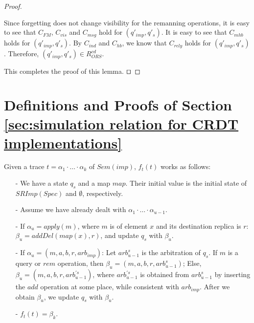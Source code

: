 \begin {proof}
\begin{itemize}
    Since forgetting does not change visibility for the remanning operations, it is easy to see that $C_{\mathit{FM}}$, $C_{\mathit{vis}}$ and $C_{\mathit{msg}}$ hold for $(q'_{\mathit{imp}},q'_s)$. It is easy to see that $C_{\mathit{mhb}}$ holds for $(q'_{\mathit{imp}},q'_s)$. By $C_{\mathit{ind}}$ and $C_{\mathit{hb}}$, we know that $C_{\mathit{rely}}$ holds for $(q'_{\mathit{imp}},q'_s)$. Therefore, $(q'_{\mathit{imp}},q'_s) \in R_{\mathit{ORS}}^{\mathit{cd}}$. 
\end{itemize} 

This completes the proof of this lemma. $\qed$
\end {proof}








\section{Definitions and Proofs of Section \ref{sec:simulation relation for CRDT implementations}}
\label{sec:appendix definitions and proofs of section simulation relation for CRDT implementations}


Given a trace $t = \alpha_1 \cdot \ldots \cdot \alpha_k$ of $Sem(imp)$, $f_t(t)$ works as follows:

\begin{itemize}
\setlength{\itemsep}{0.5pt}
\item[-] We have a state $q_s$ and a map $\mathit{map}$. Their initial value is the initial state of $SRImp(Spec)$ and $\emptyset$, respectively.

\item[-] Assume we have already dealt with $\alpha_1 \cdot \ldots \cdot \alpha_{u-1}$.

\item[-] If $\alpha_u = apply(m)$, where $m$ is of element $x$ and its destination replica is $r$: $\beta_u = addDel(map(x),r)$, and update $q_s$ with $\beta_u$.

\item[-] If $\alpha_u = (m,a,b,r,\mathit{arb}_{\mathit{imp}})$: Let $\mathit{arb}_{u-1}^s$ is the arbitration of $q_s$. If $m$ is a query or $\mathit{rem}$ operation, then $\beta_u = (m,a,b,r,\mathit{arb}_{u-1}^s)$; Else, $\beta_u = (m,a,b,r,\mathit{arb}_{u-1}^{'s})$, where $\mathit{arb}_{u-1}^{'s}$ is obtained from $\mathit{arb}_{u-1}^s$ by inserting the $add$ operation at some place, while consistent with $\mathit{arb}_{\mathit{imp}}$. After we obtain $\beta_u$, we update $q_s$ with $\beta_u$.

\item[-] $f_t(t) = \beta_k$.
\end{itemize}
















